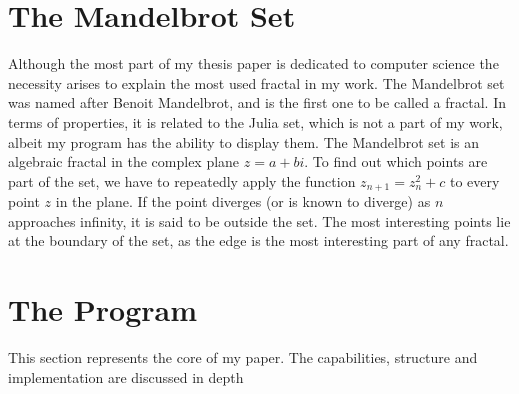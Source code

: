\documentclass[10pt,a4paper,titlepage]{article}
\begin{document}
	
	\section{The Mandelbrot Set}
	Although the most part of my thesis paper is dedicated to computer science the necessity arises to explain the most used fractal in my work. The Mandelbrot set was named after Benoit Mandelbrot, and is the first one to be called a fractal. In terms of properties, it is related to the Julia set, which is not a part of my work, albeit my program has the ability to display them. The Mandelbrot set is an algebraic fractal in the complex plane \(z = a + b i\). To find out which points are part of the set, we have to repeatedly apply the function \(z_{n+1} = z_{n}^2 + c\) to every point \(z\) in the plane. If the point diverges (or is known to diverge) as \(n\) approaches infinity, it is said to be outside the set. The most interesting points lie at the boundary of the set, as the edge is the most interesting part of any fractal.
	
	\section{The Program}
	This section represents the core of my paper. The capabilities, structure and implementation are discussed in depth
\end{document}
